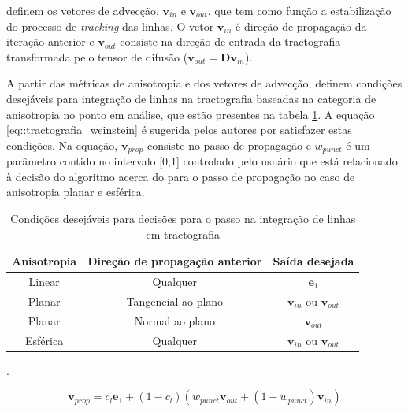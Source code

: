\documentclass[
    12pt,                %
    oneside,            %
    a4paper,            %
    english,            %
    french,                %
    spanish,            %
    brazil                %
    ]{abntex2}
\begin{document}
 definem os vetores de advecção, $\mathbf{v}_{in}$ e $\mathbf{v}_{out}$, que tem como função a estabilização do processo de \textit{tracking} das linhas. O vetor $\mathbf{v}_{in}$ é direção de propagação da iteração anterior e $\mathbf{v}_{out}$  consiste na direção de entrada da tractografia transformada pelo tensor de difusão ($\mathbf{v}_{out} = \mathbf{D}\mathbf{v}_{in}$).

A partir das métricas de anisotropia e dos vetores de advecção,  definem condições desejáveis para integração de linhas na tractografia baseadas na categoria de anisotropia no ponto em análise, que estão presentes na tabela \ref{tab::tracto_desirable_conditions}. A equação \ref{eq::tractografia_weinstein} é sugerida pelos autores por satisfazer estas condições. Na equação, $\textbf{v}_{prop}$ consiste no passo de propagação e $w_{punct}$ é um parâmetro contido no intervalo [0,1] controlado pelo usuário que está relacionado à decisão do algoritmo acerca do  para o passo de propagação no caso de anisotropia planar e esférica.

\begin{table}[h]
\centering
\begin{tabular}{|c|c|c|}
\hline
\textbf{Anisotropia} & \textbf{Direção de propagação anterior} & \textbf{Saída desejada} \\ \hline
Linear               & Qualquer                                & $\mathbf{e}_1$                   \\ \hline
Planar               & Tangencial ao plano                     & $\mathbf{v}_{in}$ ou $\mathbf{v}_{out}$   \\ \hline
Planar               & Normal ao plano                         & $\mathbf{v}_{out}$            \\ \hline
Esférica             & Qualquer                                & $\mathbf{v}_{in}$ ou $\mathbf{v}_{out}$   \\ \hline
\end{tabular}
\caption{Condições desejáveis para decisões para o passo na integração de linhas em tractografia \cite{Weinstein1999}}.
\label{tab::tracto_desirable_conditions}
\end{table}

\begin{equation}
\label{eq::tractografia_weinstein}
    \textbf{v}_{prop} = c_l\mathbf{e}_1 + (1 - c_l)(w_{punct}\mathbf{v}_{out} + (1-w_{punct})\mathbf{v}_{in})
\end{equation}
\end{document}
